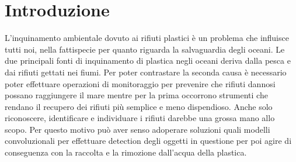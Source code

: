 \section*{Introduzione}

L'inquinamento ambientale dovuto ai rifiuti plastici è un problema che influisce tutti noi, nella fattispecie per quanto riguarda la salvaguardia 
degli oceani. Le due principali fonti di inquinamento di plastica negli oceani deriva dalla pesca e dai rifiuti gettati nei fiumi. 
Per poter contrastare la seconda causa è necessario poter effettuare operazioni di monitoraggio per prevenire che rifiuti dannosi 
possano raggiungere il mare mentre per la prima occorrono strumenti che rendano il recupero dei rifiuti più semplice e meno dispendioso. 
Anche solo riconoscere, identificare e individuare i rifiuti darebbe una grossa mano allo scopo. Per questo motivo può aver senso adoperare soluzioni 
quali modelli convoluzionali per effettuare detection degli oggetti in questione per poi agire di conseguenza con la raccolta e 
la rimozione dall'acqua della plastica.